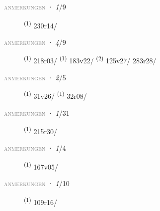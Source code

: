 \textsc{\textcolor{gray}{anmerkungen}}
\ENTRYEND
\noindent{} · \textit{1}/9 \LEMMALINE
\begin{description}
    \item[]  \textsuperscript{(1)} \mbox{230r14/}
\end{description}
\textsc{\textcolor{gray}{anmerkungen}}
\ENTRYEND
\noindent{} · \textit{4}/9 \LEMMALINE
\begin{description}
    \item[]  \textsuperscript{(1)} \mbox{218r03/} \CASEBREAK {} \textsuperscript{(1)} \mbox{183v22/} \CASEBREAK {} \textsuperscript{(2)} \mbox{125v27/} \mbox{283r28/}
\end{description}
\textsc{\textcolor{gray}{anmerkungen}}
\ENTRYEND
\noindent{} · \textit{2}/5 \LEMMALINE
\begin{description}
    \item[]  \textsuperscript{(1)} \mbox{31v26/} \textsuperscript{(1)} \mbox{32r08/}
\end{description}
\textsc{\textcolor{gray}{anmerkungen}}
\ENTRYEND
\noindent{} · \textit{1}/31 \LEMMALINE
\begin{description}
    \item[]  \textsuperscript{(1)} \mbox{215r30/}
\end{description}
\textsc{\textcolor{gray}{anmerkungen}}
\ENTRYEND
\noindent{} · \textit{1}/4 \LEMMALINE
\begin{description}
    \item[]  \textsuperscript{(1)} \mbox{167v05/}
\end{description}
\textsc{\textcolor{gray}{anmerkungen}}
\ENTRYEND
\noindent{} · \textit{1}/10 \LEMMALINE
\begin{description}
    \item[]  \textsuperscript{(1)} \mbox{109r16/}
\end{description}
